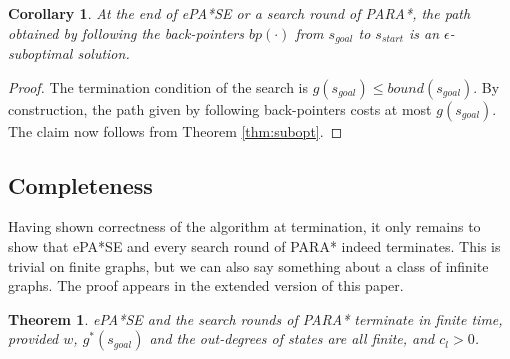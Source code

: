 \documentclass[letterpaper]{article}
\newtheorem{thm}{Theorem}
\newtheorem{cor}{Corollary}
\begin{document}
\begin{cor}
\label{cor:subopt}
At the end of ePA*SE or a search round of PARA*, the path obtained by following the back-pointers $bp(\cdot)$ from $s_{goal}$ to $s_{start}$ is an $\epsilon$-suboptimal solution.
\end{cor}

\begin{proof}
The termination condition of the search is $g(s_{goal}) \le bound(s_{goal})$. By construction, the path given by following back-pointers costs at most $g(s_{goal})$. The claim now follows from Theorem \ref{thm:subopt}.
\end{proof}

\subsection{Completeness}

Having shown correctness of the algorithm at termination, it only remains to show that ePA*SE and every search round of PARA* indeed terminates. This is trivial on finite graphs, but we can also say something about a class of infinite graphs. The proof appears in the extended version of this paper.

\begin{thm}
\label{thm:complete}
ePA*SE and the search rounds of PARA* terminate in finite time, provided $w$, $g^*(s_{goal})$ and the out-degrees of states are all finite, and $c_l > 0$.
\end{thm}
\end{document}
